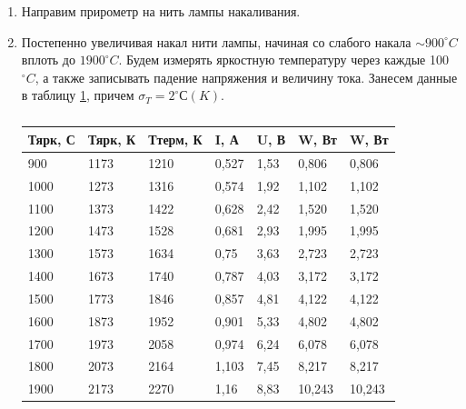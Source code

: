 \documentclass[a4paper]{article}
\begin{document}
\begin{enumerate}
    \item Направим прирометр на нить лампы накаливания.
    
    \item Постепенно увеличивая накал нити лампы, начиная со слабого накала $\sim  900 ^{\circ} C$ вплоть до $1900 ^{\circ} C$. 
    Будем измерять яркостную температуру через каждые 100 $^{\circ} C$, а также записывать падение напряжения и величину тока. 
    Занесем данные в таблицу \ref{t1}, причем $\sigma_T = 2^{\circ}С(K)$.
    
    \begin{table}[h]
        \centering
        \caption{}
        \label{t1}
        \begin{tabular}{|l|l|l|l|l|l|l|}
        \hline
        Тярк, С & Тярк, К & Ттерм, К & I, А  & U, В & W, Вт  & W, Вт  \\ \hline
        900     & 1173    & 1210     & 0,527 & 1,53 & 0,806  & 0,806  \\ \hline
        1000    & 1273    & 1316     & 0,574 & 1,92 & 1,102  & 1,102  \\ \hline
        1100    & 1373    & 1422     & 0,628 & 2,42 & 1,520  & 1,520  \\ \hline
        1200    & 1473    & 1528     & 0,681 & 2,93 & 1,995  & 1,995  \\ \hline
        1300    & 1573    & 1634     & 0,75  & 3,63 & 2,723  & 2,723  \\ \hline
        1400    & 1673    & 1740     & 0,787 & 4,03 & 3,172  & 3,172  \\ \hline
        1500    & 1773    & 1846     & 0,857 & 4,81 & 4,122  & 4,122  \\ \hline
        1600    & 1873    & 1952     & 0,901 & 5,33 & 4,802  & 4,802  \\ \hline
        1700    & 1973    & 2058     & 0,974 & 6,24 & 6,078  & 6,078  \\ \hline
        1800    & 2073    & 2164     & 1,103 & 7,45 & 8,217  & 8,217  \\ \hline
        1900    & 2173    & 2270     & 1,16  & 8,83 & 10,243 & 10,243 \\ \hline
        \end{tabular}
    \end{table}


\end{enumerate}
\end{document}
